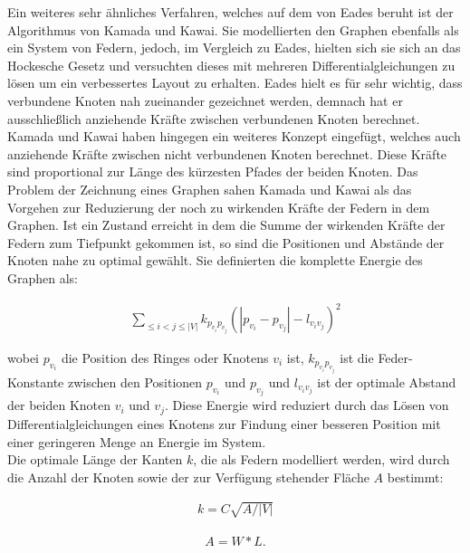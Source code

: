 Ein weiteres sehr ähnliches Verfahren, welches auf dem von Eades beruht ist der Algorithmus von Kamada und Kawai. Sie modellierten den Graphen ebenfalls als ein System von Federn, jedoch, im Vergleich zu Eades, hielten sich sie sich an das Hockesche Gesetz und versuchten dieses mit mehreren Differentialgleichungen zu lösen um ein verbessertes Layout zu erhalten. Eades hielt es für sehr wichtig, dass verbundene Knoten nah zueinander gezeichnet werden, demnach hat er ausschließlich anziehende Kräfte zwischen verbundenen Knoten berechnet. Kamada und Kawai haben hingegen ein weiteres Konzept eingefügt, welches auch anziehende Kräfte zwischen nicht verbundenen Knoten berechnet. Diese Kräfte sind proportional zur Länge des kürzesten Pfades der beiden Knoten. Das Problem der Zeichnung eines Graphen sahen Kamada und Kawai als das Vorgehen zur Reduzierung der noch zu wirkenden Kräfte der Federn in dem Graphen. Ist ein Zustand erreicht in dem die Summe der wirkenden Kräfte der Federn zum Tiefpunkt gekommen ist, so sind die Positionen und Abstände der Knoten nahe zu optimal gewählt. Sie definierten die komplette Energie des Graphen als: 

\begin{align}
	\sum_{\leq i < j\leq |V|}k_{p_{v_{i}}p_{v_{j}}}(|p_{v_{i}}-p_{v_{j}}|-l_{v_{i}v_{j}})^{2}
\end{align}

wobei $p_{v_{i}}$ die Position des Ringes oder Knotens $v_{i}$ ist, $k_{p_{v_{i}}p_{v_{j}}}$ ist die Feder-Konstante zwischen den Positionen $p_{v_{i}}$ und $p_{v_{j}}$ und $l_{v_{i}v_{j}}$ ist der optimale Abstand der beiden Knoten $v_{i}$ und $v_{j}$. Diese Energie wird reduziert durch das Lösen von Differentialgleichungen eines Knotens zur Findung einer besseren Position mit einer geringeren Menge an Energie im System.\\


 Die optimale Länge der Kanten $k$, die als Federn modelliert werden, wird durch die Anzahl der Knoten sowie der zur Verfügung stehender Fläche $A$ bestimmt:

\begin{align}
	k =
	C\sqrt{A / |V|}
\end{align}

\begin{align}
	A =
	W * L.
\end{align}

